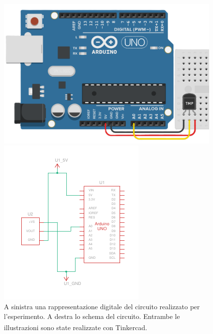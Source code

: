             \begin{figure}[t]
                \centering
                    \begin{minipage}{0.49\textwidth}
                        \includegraphics[width = \textwidth]{images/arduino/temp-pic.png}
                    \end{minipage}
                    \hfill
                    \begin{minipage}{0.49\textwidth}
                        \includegraphics[width = \textwidth]{images/arduino/temp-scheme.pdf}
                    \end{minipage}
                    \caption{A sinistra una rappresentazione digitale del circuito realizzato per l'esperimento. A destra lo schema del circuito. Entrambe le illustrazioni sono state realizzate con Tinkercad\textsuperscript{\textregistered}.}
                    \label{fig:arduino-1}
            \end{figure}

